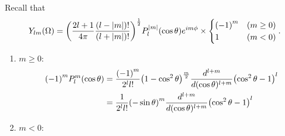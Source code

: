 \item

Recall that
\[
    Y_{lm}(\Omega)
    = {\left( \frac{2l + 1}{4\pi} \frac{(l - \left| m \right|)!}{(l + \left| m \right|)!} \right)}^{\frac{1}{2}}
       P_l^{\left| m \right|}(\cos\theta) e^{im\phi}
       \times \begin{cases}
           {(-1)}^m & (m \geq 0) \\
           1        & (m < 0)
       \end{cases}.
\]
\begin{enumerate}[wide, labelindent = 0pt, label = (\roman*)]
\item $m \geq 0$:
\begin{align*}
    {(-1)}^m P_l^m(\cos\theta)
    &= \frac{{(-1)}^m}{2^l l!} {\left( 1- \cos^2\theta \right)}^{\frac{m}{2}}
       \frac{d^{l + m}}{d{(\cos\theta)^{l + m}}}
       {\left( \cos^2\theta - 1 \right)}^l \\
    &= \frac{1}{2^l l!} {\left( -\sin\theta \right)}^m
       \frac{d^{l + m}}{d{(\cos\theta)^{l + m}}}
       {\left( \cos^2\theta - 1 \right)}^l
\end{align*}

\item $m < 0$:
\notyet
\end{enumerate}